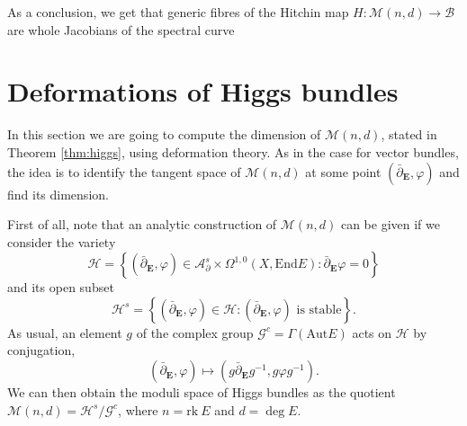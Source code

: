 \documentclass[12pt,a4paper]{book}
\theoremstyle{definition} \newtheorem{defn}[thm]{Definition}
\theoremstyle{definition} \newtheorem{ejemplo}[thm]{Example}
\theoremstyle{remark} \newtheorem{rem}[thm]{Remark}
\def\AA{\mathscr{A}}
\def\BB{\mathscr{B}}
\def\HH{\mathscr{H}}
\def\GG{\mathscr{G}}
\def\rk{\mathrm{rk}}
\def\End{\mathrm{End}}
\def\Aut{\mathrm{Aut}}
\def\Hig{\mathscr{M}}
\def\delbar{\bar{\partial}}
\newcommand{\ve}[1]{\mathbf{#1}}
\begin{document}
	    As a conclusion, we get that generic fibres of the Hitchin map $H:\Hig(n,d) \rightarrow \BB$ are whole Jacobians of the spectral curve

	    \section{Deformations of Higgs bundles}
	    In this section we are going to compute the dimension of $\Hig(n,d)$, stated in Theorem \ref{thm:higgs}, using deformation theory. As in the case for vector bundles, the idea is to identify the tangent space of $\Hig(n,d)$ at some point $(\delbar_{\ve{E}},\varphi)$ and find its dimension.

	    First of all, note that an analytic construction of $\Hig(n,d)$ can be given if we consider the variety
	    \begin{equation*}
	     \HH= \left\{(\delbar_{\ve{E}},\varphi) \in\AA^s_\partial \times \Omega^{1,0}(X,\End E) : \delbar_{\ve{E}}\varphi=0 \right\}
	    \end{equation*}
	    and its open subset
	    \begin{equation*}
	      \HH^s=\left\{ (\delbar_{\ve{E}},\varphi) \in \HH : (\delbar_{\ve{E}},\varphi) \text{ is stable} \right\}      .
	    \end{equation*}
	    As usual, an element $g$ of the complex group $\GG^c=\Gamma(\Aut E)$ acts on $\HH$ by conjugation,
	    \begin{equation*}
	      (\delbar_{\ve{E}},\varphi) \mapsto (g\delbar_{\ve{E}}g^{-1},g\varphi g^{-1}).
	    \end{equation*}
	    We can then obtain the moduli space of Higgs bundles as the quotient $\Hig(n,d)=\HH^s/\GG^c$, where $n=\rk\ E$ and $d= \deg E$.
\end{document}
